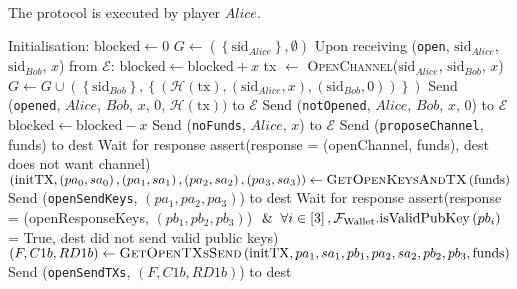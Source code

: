 \ \\  The protocol is executed by player $Alice$.
  \label{alg:lightningprot}
  \begin{algorithmic}[1]
    \State Initialisation:
      \State $\mathrm{blocked} \leftarrow 0$
      \State $G \leftarrow \left(\left\{\mathrm{sid}_{Alice}\right\}, \emptyset\right)$
    \State
    \State Upon receiving (\texttt{open}, $\mathrm{sid}_{Alice}$, $\mathrm{sid}_{Bob}$,
    $x$) from $\mathcal{E}$:
        \State $\mathrm{blocked} \leftarrow \mathrm{blocked} + x$
        \State tx $\gets$ \textsc{OpenChannel}($\mathrm{sid}_{Alice}$,
        $\mathrm{sid}_{Bob}$, $x$)
          \State $G \leftarrow G \cup \left(\left\{\mathrm{sid}_{Bob}\right\},
          \left\{\left(\mathcal{H}\left(\mathrm{tx}\right), \left(\mathrm{sid}_{Alice},
          x\right), \left(\mathrm{sid}_{Bob}, 0\right)\right)\right\}\right)$
          \State Send (\texttt{opened}, $Alice$, $Bob$, $x$, 0,
          $\mathcal{H}\left(\mathrm{tx}\right))$ to $\mathcal{E}$
        \Else
          \State Send (\texttt{notOpened}, $Alice$, $Bob$, $x$, 0) to $\mathcal{E}$
        \EndIf
        \State $\mathrm{blocked} \leftarrow \mathrm{blocked} - x$
      \Else
        \State Send (\texttt{noFunds}, $Alice$, $x$) to $\mathcal{E}$
      \EndIf
    \State
      \State Send (\texttt{proposeChannel}, funds) to dest
      \State Wait for response
      \State assert(response = (openChannel, funds),
      \Indent
        \State dest does not want channel)
      \EndIndent
      \State $\left(\mathrm{initTX}, \left(pa_0, sa_0\right), \left(pa_1, sa_1\right),
      \left(pa_2, sa_2\right), \left(pa_3, sa_3\right)\right) \gets
      \textsc{GetOpenKeysAndTX}\left(\mathrm{funds}\right)$
      \State Send (\texttt{openSendKeys}, $\left(pa_1, pa_2, pa_3\right)$) to dest
      \State Wait for response
      \State assert(response = (openResponseKeys, $\left(pb_1, pb_2, pb_3\right)$)
      \Indent
        \State $\And \forall i \in \left[3\right],
        \mathcal{F}_{\mathrm{Wallet}}.\mathrm{isValidPubKey}\left(pb_i\right)$ = True,
        \State dest did not send valid public keys)
      \EndIndent
      \State $\left(F, C1b, RD1b\right) \gets
      \textsc{GetOpenTXsSend}\left(\mathrm{initTX}, pa_1, sa_1, pb_1, pa_2, sa_2,
      pb_2, pb_3, \mathrm{funds}\right)$
      \State Send (\texttt{openSendTXs}, $\left(F, C1b, RD1b\right)$) to dest

\end{algorithmic}
